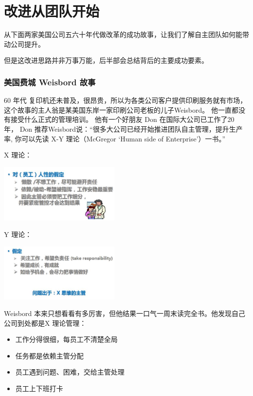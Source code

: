 \chapter{改进从团队开始} %

从下面两家美国公司五六十年代做改革的成功故事，让我们了解自主团队如何能带动公司提升。

但是这改进思路并非万事万能，后半部会总结背后的主要成功要素。

\hypertarget{ux7f8eux56fdux8d39ux57ce-weisbord-ux6545ux4e8b}{%
\subsection{美国费城 Weisbord
故事}\label{ux7f8eux56fdux8d39ux57ce-weisbord-ux6545ux4e8b}}

60 年代 复印机还未普及，很昂贵，所以为各类公司客户提供印刷服务就有市场，
这个故事的主人翁是某美国东岸一家印刷公司老板的儿子Weisbord。
他一直都没有接受什么正式的管理培训。 他有一个好朋友 Don
在国际大公司已工作了20 年， Don
推荐Weisbord说：``很多大公司已经开始推进团队自主管理，提升生产率, 
你可以先读 X-Y 理论（McGregor `Human side of Enterprise'）一书。''

X 理论：


\includegraphics[width=6cm]{0A_Agile_stories_p2.jpg}

Y 理论：


\includegraphics[width=6cm]{0A_Agile_stories_p3.jpg}

Weisbord
本来只想看看有多厉害，但他结果一口气一周末读完全书。他发现自己公司到处都是X
理论管理：

\begin{itemize}
\tightlist
\item
  工作分得很细，每员工不清楚全局
\item
  任务都是依赖主管分配
\item
  员工遇到问题、困难，交给主管处理
\item
  员工上下班打卡
\end{itemize}

